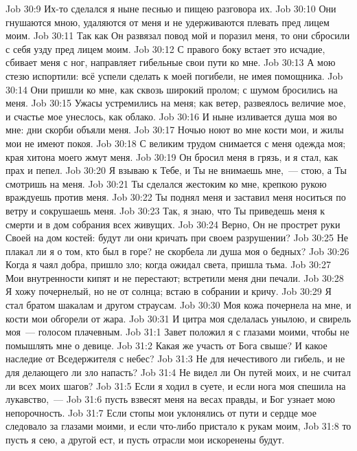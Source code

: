 \vs Job 30:9 Их-то сделался я ныне песнью и пищею разговора их.
\vs Job 30:10 Они гнушаются мною, удаляются от меня и не удерживаются плевать пред лицем моим.
\vs Job 30:11 Так как Он развязал повод мой и поразил меня, то они сбросили с себя узду пред лицем моим.
\vs Job 30:12 С правого боку встает это исчадие, сбивает меня с ног, направляет гибельные свои пути ко мне.
\vs Job 30:13 А мою стезю испортили: всё успели сделать к моей погибели, не имея помощника.
\vs Job 30:14 Они пришли ко мне, как сквозь широкий пролом; с шумом бросились на меня.
\vs Job 30:15 Ужасы устремились на меня; как ветер, развеялось величие мое, и счастье мое унеслось, как облако.
\vs Job 30:16 И ныне изливается душа моя во мне: дни скорби объяли меня.
\vs Job 30:17 Ночью ноют во мне кости мои, и жилы мои не имеют покоя.
\vs Job 30:18 С великим трудом снимается с меня одежда моя; края хитона моего жмут меня.
\vs Job 30:19 Он бросил меня в грязь, и я стал, как прах и пепел.
\vs Job 30:20 Я взываю к Тебе, и Ты не внимаешь мне,~--- стою, а Ты  смотришь на меня.
\vs Job 30:21 Ты сделался жестоким ко мне, крепкою рукою враждуешь против меня.
\vs Job 30:22 Ты поднял меня и заставил меня носиться по ветру и сокрушаешь меня.
\vs Job 30:23 Так, я знаю, что Ты приведешь меня к смерти и в дом собрания всех живущих.
\vs Job 30:24 Верно, Он не прострет руки Своей на дом костей: будут ли они кричать при своем разрушении?
\vs Job 30:25 Не плакал ли я о том, кто был в горе? не скорбела ли душа моя о бедных?
\vs Job 30:26 Когда я чаял добра, пришло зло; когда ожидал света, пришла тьма.
\vs Job 30:27 Мои внутренности кипят и не перестают; встретили меня дни печали.
\vs Job 30:28 Я хожу почернелый, но не от солнца; встаю в собрании и кричу.
\vs Job 30:29 Я стал братом шакалам и другом страусам.
\vs Job 30:30 Моя кожа почернела на мне, и кости мои обгорели от жара.
\vs Job 30:31 И цитра моя сделалась унылою, и свирель моя~--- голосом плачевным.
\vs Job 31:1 Завет положил я с глазами моими, чтобы не помышлять мне о девице.
\vs Job 31:2 Какая же участь  от Бога свыше? И какое наследие от Вседержителя с небес?
\vs Job 31:3 Не для нечестивого ли гибель, и не для делающего ли зло напасть?
\vs Job 31:4 Не видел ли Он путей моих, и не считал ли всех моих шагов?
\vs Job 31:5 Если я ходил в суете, и если нога моя спешила на лукавство,~---
\vs Job 31:6 пусть взвесят меня на весах правды, и Бог узнает мою непорочность.
\vs Job 31:7 Если стопы мои уклонялись от пути и сердце мое следовало за глазами моими, и если что-либо  пристало к рукам моим,
\vs Job 31:8 то пусть я сею, а другой ест, и пусть отрасли мои искоренены будут.
